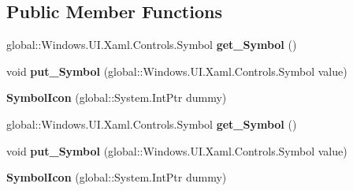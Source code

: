 \subsection*{Public Member Functions}
\begin{DoxyCompactItemize}
\item 
\mbox{\label{class_windows_1_1_u_i_1_1_xaml_1_1_controls_1_1_symbol_icon_a5bb14b0bce6c93d2995fe916df39828f}} 
global\+::\+Windows.\+U\+I.\+Xaml.\+Controls.\+Symbol {\bfseries get\+\_\+\+Symbol} ()
\item 
\mbox{\label{class_windows_1_1_u_i_1_1_xaml_1_1_controls_1_1_symbol_icon_a4f2423f82a5b8810309632895e157654}} 
void {\bfseries put\+\_\+\+Symbol} (global\+::\+Windows.\+U\+I.\+Xaml.\+Controls.\+Symbol value)
\item 
\mbox{\label{class_windows_1_1_u_i_1_1_xaml_1_1_controls_1_1_symbol_icon_aacfa748103e37307067fb1aee74bda08}} 
{\bfseries Symbol\+Icon} (global\+::\+System.\+Int\+Ptr dummy)
\item 
\mbox{\label{class_windows_1_1_u_i_1_1_xaml_1_1_controls_1_1_symbol_icon_a5bb14b0bce6c93d2995fe916df39828f}} 
global\+::\+Windows.\+U\+I.\+Xaml.\+Controls.\+Symbol {\bfseries get\+\_\+\+Symbol} ()
\item 
\mbox{\label{class_windows_1_1_u_i_1_1_xaml_1_1_controls_1_1_symbol_icon_a4f2423f82a5b8810309632895e157654}} 
void {\bfseries put\+\_\+\+Symbol} (global\+::\+Windows.\+U\+I.\+Xaml.\+Controls.\+Symbol value)
\item 
\mbox{\label{class_windows_1_1_u_i_1_1_xaml_1_1_controls_1_1_symbol_icon_aacfa748103e37307067fb1aee74bda08}} 
{\bfseries Symbol\+Icon} (global\+::\+System.\+Int\+Ptr dummy)
\item 
\mbox{\label{class_windows_1_1_u_i_1_1_xaml_1_1_controls_1_1_symbol_icon_a5bb14b0bce6c93d2995fe916df39828f}} 

\end{DoxyCompactItemize}
